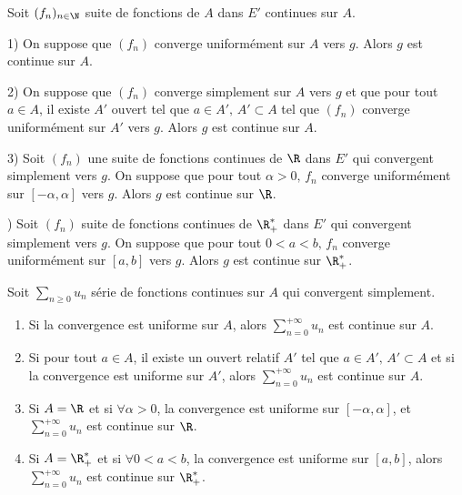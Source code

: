 \begin{theoreme}{}{}
    Soit $(f_n)_{n \in \N}$ suite de fonctions de $A$ dans $E'$ continues sur $A$. 
    
    1) On suppose que $(f_n)$ converge uniformément sur $A$ vers $g$. Alors $g$ est continue sur $A$.


    2) On suppose que $(f_n)$ converge simplement sur $A$ vers $g$ et que pour tout $a \in A$,
    il existe $A'$ ouvert tel que $a \in A', \, A' \subset A$ tel que $(f_n)$ converge uniformément sur $A'$ vers $g$.
    Alors $g$ est continue sur $A$.


    3) Soit $(f_n)$ une suite de fonctions continues de $\R$ dans $E'$ qui convergent simplement vers $g$. 
    On suppose que pour tout $\alpha > 0, \, f_n$ converge uniformément sur $[-\alpha, \alpha]$ vers $g$.
    Alors $g$ est continue sur $\R$.

    ) Soit $(f_n)$ suite de fonctions continues de $\R_+^*$ dans $E'$ qui convergent simplement vers $g$. 
    On suppose que pour tout $0<a<b, \, f_n$ converge uniformément sur $[a, b]$ vers $g$.
    Alors $g$ est continue sur $\R_+^*$.
\end{theoreme}

\begin{theoreme}{}{}
    Soit $\sum_{n \geqslant 0 } u_n$ série de fonctions continues sur $A$ qui convergent 
    simplement. 

    \begin{enumerate}
        \item Si la convergence est uniforme sur $A$, alors $\displaystyle \sum_{n = 0}^{+ \infty} u_n$ est continue sur $A$.
        \item Si pour tout $a \in A$, il existe un ouvert relatif $A'$ tel que $a \in A', \, A' \subset A$ et
        si la convergence est uniforme sur $A'$, alors $\displaystyle \sum_{n = 0}^{+ \infty} u_n$ est continue sur $A$.
        \item Si $A = \R$ et si $\forall \alpha > 0$, la convergence est uniforme sur $[-\alpha, \alpha]$, 
        et $\displaystyle \sum_{n = 0}^{+ \infty} u_n$ est continue sur $\R$.
        \item Si $A = \R_+^*$ et si $\forall 0 < a < b$, la convergence est uniforme sur $[a, b]$,
        alors $\displaystyle \sum_{n = 0}^{+ \infty} u_n$ est continue sur $\R_+^*$.
    \end{enumerate}
\end{theoreme}

